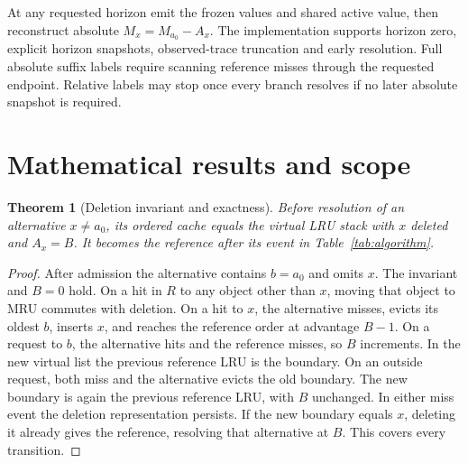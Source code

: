 \documentclass[11pt,letterpaper]{article}
\newtheorem{theorem}{Theorem}
\begin{document}
At any requested horizon emit the frozen values and shared active value, then reconstruct absolute \(M_x=M_{a_0}-A_x\). The implementation supports horizon zero, explicit horizon snapshots, observed-trace truncation and early resolution. Full absolute suffix labels require scanning reference misses through the requested endpoint. Relative labels may stop once every branch resolves if no later absolute snapshot is required.

\section{Mathematical results and scope}
\begin{theorem}[Deletion invariant and exactness]
Before resolution of an alternative \(x\ne a_0\), its ordered cache equals the virtual LRU stack with \(x\) deleted and \(A_x=B\). It becomes the reference after its event in Table~\ref{tab:algorithm}.
\end{theorem}
\begin{proof}
After admission the alternative contains \(b=a_0\) and omits \(x\). The invariant and \(B=0\) hold. On a hit in \(R\) to any object other than \(x\), moving that object to MRU commutes with deletion. On a hit to \(x\), the alternative misses, evicts its oldest \(b\), inserts \(x\), and reaches the reference order at advantage \(B-1\). On a request to \(b\), the alternative hits and the reference misses, so \(B\) increments. In the new virtual list the previous reference LRU is the boundary. On an outside request, both miss and the alternative evicts the old boundary. The new boundary is again the previous reference LRU, with \(B\) unchanged. In either miss event the deletion representation persists. If the new boundary equals \(x\), deleting it already gives the reference, resolving that alternative at \(B\). This covers every transition.
\end{proof}
\end{document}
